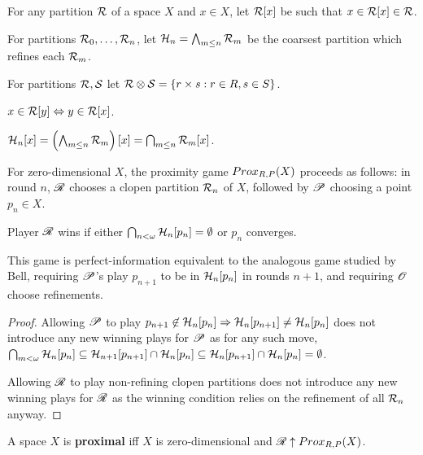 



\begin{definition}
  For any partition $\mathcal{R}$ of a space $X$ and $x\in X$, let $\mathcal{R}[x]$ be such that $x\in\mathcal{R}[x]\in\mathcal{R}$.

  For partitions $\mathcal{R}_0,\dots,\mathcal{R}_n$, let $\mathcal{H}_n=\bigwedge_{m\leq n} \mathcal{R}_m$ be the coarsest partition which refines each $\mathcal{R}_m$.

  For partitions $\mathcal{R},\mathcal{S}$ let $\mathcal{R}\otimes \mathcal{S} = \{r\times s: r\in R, s\in S\}$.
\end{definition}

\begin{proposition}
  $x\in \mathcal{R}[y] \Leftrightarrow y\in \mathcal{R}[x]$.

  $\mathcal{H}_n[x]=\left(\bigwedge_{m\leq n} \mathcal{R}_m\right)[x]=\bigcap_{m\leq n}\mathcal{R}_m[x]$.
\end{proposition}

\begin{definition}
  For zero-dimensional $X$, the proximity game $Prox_{R,P}(X)$ proceeds as follows: in round $n$, $\mathscr{R}$ chooses a clopen partition $\mathcal{R}_n$ of $X$, followed by $\mathscr{P}$ choosing a point $p_n\in X$.

  Player $\mathscr{R}$ wins if either $\bigcap_{n<\omega} \mathcal{H}_n[p_n] = \emptyset$ or $p_n$ converges.
\end{definition}

\begin{proposition}
  This game is perfect-information equivalent to the analogous game studied by Bell, requiring $\mathscr{P}$'s play $p_{n+1}$ to be in $\mathcal{H}_n[p_n]$ in rounds $n+1$, and requiring $\mathscr{O}$ choose refinements.
\end{proposition}

\begin{proof}
  Allowing $\mathscr{P}$ to play $p_{n+1}\not\in \mathcal{H}_n[p_n]\Rightarrow \mathcal{H}_n[p_{n+1}]\not=\mathcal{H}_n[p_n]$ does not introduce any new winning plays for $\mathscr{P}$ as for any such move, $\bigcap_{m<\omega}\mathcal{H}_n[p_n]\subseteq \mathcal{H}_{n+1}[p_{n+1}]\cap \mathcal{H}_n[p_n]\subseteq \mathcal{H}_n[p_{n+1}]\cap \mathcal{H}_n[p_n]=\emptyset$.

  Allowing $\mathscr{R}$ to play non-refining clopen partitions does not introduce any new winning plays for $\mathscr{R}$ as the winning condition relies on the refinement of all $\mathcal{R}_n$ anyway.
\end{proof}

\begin{definition}
  A space $X$ is \textbf{proximal} iff $X$ is zero-dimensional and $\mathscr{R}\uparrow Prox_{R,P}(X)$.
\end{definition}

